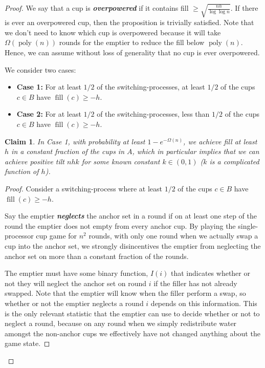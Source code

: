 \documentclass[twocolumn]{article}[10pt]
\newcommand{\defn}[1]{{\textit{\textbf{\boldmath #1}}}\xspace}
\DeclareMathOperator{\poly}{\text{poly}}
\DeclareMathOperator{\fil}{\text{fill}}
\newtheorem{clm}{Claim}
\begin{document}
\begin{proof}
We say that a cup is \defn{overpowered} if it contains fill $\ge
\sqrt{\frac{nh}{\log\log n}}$. If there is ever an overpowered cup, then the
proposition is trivially satisfied. Note that we don't need to know which cup
is overpowered because it will take $\Omega(\poly(n))$ rounds for the emptier
to reduce the fill below $\poly(n)$. Hence, we can assume without loss
of generality that no cup is ever overpowered.

We consider two cases:
\begin{itemize}
  \item \textbf{Case 1:} For at least $1/2$ of the switching-processes, at
    least $1/2$ of the cups $c \in B$ have $\fil(c) \ge -h$.
  \item \textbf{Case 2:} For at least $1/2$ of the switching-processes, less
    than $1/2$ of the cups $c \in B$ have $\fil(c) \ge -h$.
\end{itemize}

\begin{clm}
  \label{clm:reg} In Case 1, with probability at least $1-e^{-\Omega(n)}$, we
  achieve fill at least $h$ in a constant fraction of the cups in $A$, which in
  particular implies that we can achieve positive tilt $nhk$ for some known
  constant $k \in (0,1)$ ($k$ is a complicated function of $h$).
\end{clm}
\begin{proof}
  Consider a switching-process where at least $1/2$ of the cups $c \in B$
  have $\fil(c) \ge -h$.

  Say the emptier \defn{neglects} the anchor set in a round if on at least one
  step of the round the emptier does not empty from every anchor cup. By
  playing the single-processor cup game for $n^2$ rounds, with only one round
  when we actually swap a cup into the anchor set, we strongly disincentives
  the emptier from neglecting the anchor set on more than a constant fraction
  of the rounds. 

  The emptier must have some binary function, $I(i)$ that indicates whether or
  not they will neglect the anchor set on round $i$ if the filler has not already
  swapped. Note that the emptier will know when the filler perform a swap, so
  whether or not the emptier neglects a round $i$ depends on this information.
  This is the only relevant statistic that the emptier can use to decide
  whether or not to neglect a round, because on any round when we simply
  redistribute water amongst the non-anchor cups we effectively have not
  changed anything about the game state. 


\end{proof}
\end{proof}
\end{document}
